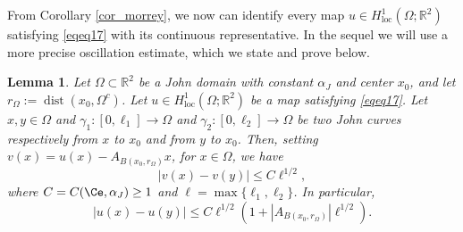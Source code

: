 \documentclass[12pt]{article}
\newtheorem{lemma}[theorem]{Lemma}
\theoremstyle{definition}
\theoremstyle{remark}
\numberwithin{equation}{section}
\DeclareMathOperator{\dist}{dist}
\newcommand{\R}{\mathbb{R}}
\begin{document}
 
From Corollary \ref{cor_morrey}, we now can identify every map $u \in H^1_{\mathrm{loc}}(\Omega;\R^2)$ satisfying
\eqref{eqeq17} with its continuous representative. In the sequel we will use a more precise oscillation estimate,
which we state and prove below.

 

\begin{lemma}
    \label{LemmaTwoCurves}
    Let $\Omega\subset\R^2$ be a John domain with constant $\alpha_J$ and center $x_0$, and let
    $r_\Omega:=\dist(x_0,\Omega^c)$. Let $u\in H^1_{\mathrm{loc}}(\Omega;\R^2)$ be a map satisfying \eqref{eqeq17}.
    Let $x,y\in\Omega$ and $\gamma_1 : [0,\ell_1]\longrightarrow\Omega$ and $\gamma_2 : [0,\ell_2]\longrightarrow\Omega$ be two John curves respectively from $x$ to $x_0$ and from $y$ to $x_0$.
    Then, setting $v(x)=u(x)-A_{B(x_0,r_\Omega)}x$, for $x\in\Omega$, we have
    \begin{equation}
        \label{eqeq39}
        |v(x)-v(y)|\leq C\ell^{1/2},
    \end{equation}
    where $C=C(\Ce, \alpha_J) \geq 1$ and $\ell=\max\{\ell_1,\ell_2\}$.  In particular,
    \begin{equation}
        |u(x)-u(y)|\leq C\ell^{1/2}(1+|A_{B(x_0,r_\Omega)}|\ell^{1/2}). \label{Holderiann}
    \end{equation}
\end{lemma}
\end{document}
